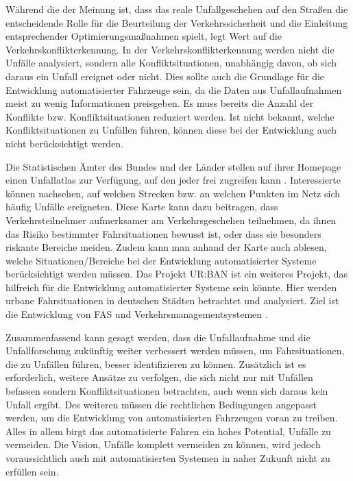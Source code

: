 Während die \Textcite[S. 12]{DEKRA.2017} der Meinung ist, dass das reale Unfallgeschehen auf den Straßen die entscheidende Rolle für die Beurteilung der Verkehrssicherheit und die Einleitung entsprechender Optimierungsmaßnahmen spielt, legt \Textcite[S. 10]{Erke.1978} Wert auf die Verkehrskonflikterkennung. In der Verkehrskonflikterkennung werden nicht die Unfälle analysiert, sondern alle Konfliktsituationen, unabhängig davon, ob sich daraus ein Unfall ereignet oder nicht. Dies sollte auch die Grundlage für die Entwicklung automatisierter Fahrzeuge sein, da die Daten aus Unfallaufnahmen meist zu wenig Informationen preisgeben. Es muss bereits die Anzahl der Konflikte bzw. Konfliktsituationen reduziert werden. Ist nicht bekannt, welche Konfliktsituationen zu Unfällen führen, können diese bei der Entwicklung auch nicht berücksichtigt werden.

Die Statistischen Ämter des Bundes und der Länder stellen auf ihrer Homepage einen Unfallatlas zur Verfügung, auf den jeder frei zugreifen kann \parencite{StatistischeAmterdesBundesundderLander.2018}. Interessierte können nachsehen, auf welchen Strecken bzw. an welchen Punkten im Netz sich häufig Unfälle ereigneten. Diese Karte kann dazu beitragen, dass Verkehrsteilnehmer aufmerksamer am Verkehrsgeschehen teilnehmen, da ihnen das Risiko bestimmter Fahrsituationen bewusst ist, oder dass sie besonders riskante Bereiche meiden. Zudem kann man anhand der Karte auch ablesen, welche Situationen/Bereiche bei der Entwicklung automatisierter Systeme berücksichtigt werden müssen. Das Projekt UR:BAN ist ein weiteres Projekt, das hilfreich für die Entwicklung automatisierter Systeme sein könnte. Hier werden urbane Fahrsituationen in deutschen Städten betrachtet und analysiert. Ziel ist die Entwicklung von \ac{FAS} und Verkehrsmanagementsystemen \parencite{UR:BANBuro.2018}.

Zusammenfassend kann gesagt werden, dass die Unfallaufnahme und die Unfallforschung zukünftig weiter verbessert werden müssen, um Fahrsituationen, die zu Unfällen führen, besser identifizieren zu können. Zusätzlich ist es erforderlich, weitere Ansätze zu verfolgen, die sich nicht nur mit Unfällen befassen sondern Konfliktsituationen betrachten, auch wenn sich daraus kein Unfall ergibt. Des weiteren müssen die rechtlichen Bedingungen angepasst werden, um die Entwicklung von automatisierten Fahrzeugen voran zu treiben. Alles in allem birgt das automatisierte Fahren ein hohes Potential, Unfälle zu vermeiden. Die Vision, Unfälle komplett vermeiden zu können, wird jedoch voraussichtlich auch mit automatisierten Systemen in naher Zukunft nicht zu erfüllen sein.
